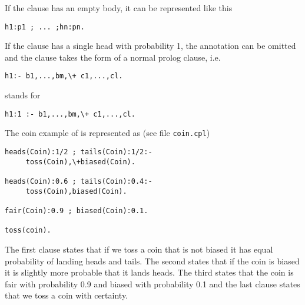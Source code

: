 \documentclass[a4paper,12pt]{article}
\begin{document}
If the clause has an empty body, it can be represented like this
\begin{verbatim}
h1:p1 ; ... ;hn:pn.
\end{verbatim}
If the clause has a single head with probability 1, the annotation can be omitted and the clause takes the form of a normal prolog clause, i.e. 
\begin{verbatim}
h1:- b1,...,bm,\+ c1,...,cl.
\end{verbatim}
stands for 
\begin{verbatim}
h1:1 :- b1,...,bm,\+ c1,...,cl.
\end{verbatim}

The coin example of  \cite{VenVer04-ICLP04-IC} is represented as (see file \texttt{coin.cpl})
\begin{verbatim}
heads(Coin):1/2 ; tails(Coin):1/2:- 
     toss(Coin),\+biased(Coin).

heads(Coin):0.6 ; tails(Coin):0.4:- 
     toss(Coin),biased(Coin).

fair(Coin):0.9 ; biased(Coin):0.1.

toss(coin).
\end{verbatim}
The first clause states that if we toss a coin that is not biased it has equal probability of landing heads and tails. The second states that if the coin is biased it is slightly more probable that it lands heads. The third states that the coin is fair with probability 0.9 and biased with probability 0.1 and the last clause states that we toss a coin with certainty.
\end{document}
